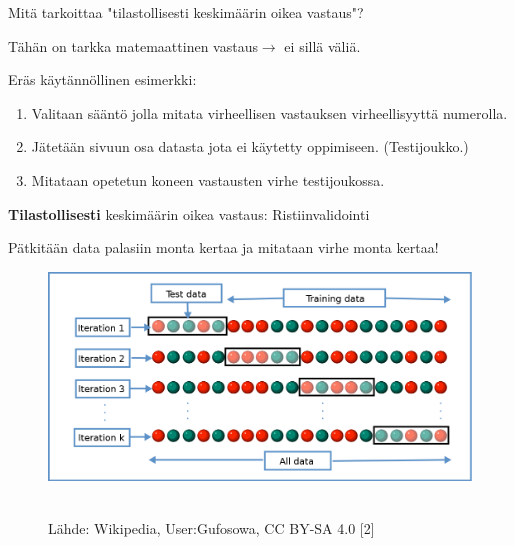 \documentclass[presentation]{beamer}
\begin{document}
\begin{frame}{Mitä tarkoittaa "tilastollisesti keskimäärin oikea vastaus"?}

Tähän on tarkka matemaattinen vastaus$\to$ ei sillä väliä.

\pause
\begin{block}{Eräs käytännöllinen esimerkki:}

\begin{enumerate}
    \item<2-> Valitaan sääntö jolla mitata virheellisen vastauksen virheellisyyttä numerolla.
    \item<3-> Jätetään sivuun osa datasta jota ei käytetty oppimiseen. (Testijoukko.)
    \item<4-> Mitataan opetetun koneen vastausten virhe testijoukossa.
\end{enumerate}

\end{block}


\end{frame}

\begin{frame}{\textbf{Tilastollisesti} keskimäärin oikea vastaus: Ristiinvalidointi}

Pätkitään data palasiin monta kertaa ja mitataan virhe monta kertaa!

	\begin{figure}
				\includegraphics[width=\textwidth]{kfold_wikipedia.png} \
				\caption*{ Lähde: Wikipedia, User:Gufosowa, CC BY-SA 4.0 [2]}
	\end{figure}

    
\end{frame}
\end{document}
